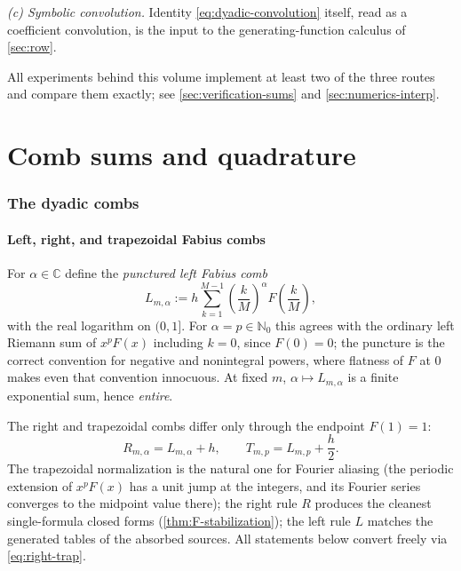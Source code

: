 \documentclass[11pt,oneside]{article}
\numberwithin{equation}{section}
\theoremstyle{definition}
\theoremstyle{remark}
\newcommand{\C}{\mathbb C}
\newcommand{\N}{\mathbb N}
\begin{document}
\emph{(c) Symbolic convolution.}  Identity
\eqref{eq:dyadic-convolution} itself, read as a coefficient convolution,
is the input to the generating-function calculus of
\cref{sec:row}.

All experiments behind this volume implement at least two of the three
routes and compare them exactly; see \cref{sec:verification-sums} and
\cref{sec:numerics-interp}.

\part{Comb sums and quadrature}
\label{part:sums}

\section{The dyadic combs}
\label{sec:combs}

\subsection{Left, right, and trapezoidal Fabius combs}

For $\alpha\in\C$ define the \emph{punctured left Fabius comb}
\begin{equation}
 L_{m,\alpha}
 :=h\sum_{k=1}^{M-1}
 \left(\frac{k}{M}\right)^{\alpha}F\!\left(\frac{k}{M}\right),
 \label{eq:L-def}
\end{equation}
with the real logarithm on $(0,1]$.  For $\alpha=p\in\N_0$ this agrees
with the ordinary left Riemann sum of $x^pF(x)$ including $k=0$, since
$F(0)=0$; the puncture is the correct convention for negative and
nonintegral powers, where flatness of $F$ at $0$ makes even that
convention innocuous.  At fixed $m$, $\alpha\mapsto L_{m,\alpha}$ is a
finite exponential sum, hence \emph{entire}.

The right and trapezoidal combs differ only through the endpoint
$F(1)=1$:
\begin{equation}
 R_{m,\alpha}=L_{m,\alpha}+h,
 \qquad
 T_{m,p}=L_{m,p}+\frac h2.
 \label{eq:right-trap}
\end{equation}
The trapezoidal normalization is the natural one for Fourier aliasing
(the periodic extension of $x^pF(x)$ has a unit jump at the integers,
and its Fourier series converges to the midpoint value there); the
right rule $R$ produces the cleanest single-formula closed forms
(\cref{thm:F-stabilization}); the left rule $L$ matches the generated
tables of the absorbed sources.  All statements below convert freely
via \eqref{eq:right-trap}.
\end{document}
